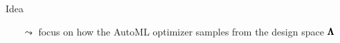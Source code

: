\begin{frame}[c,fragile]{Idea}

\begin{center}
\scalebox{0.9}{
	\let\oldpause=\pause \def\pause{} 
	
	\let\pause=\oldpause
}
\end{center}

\begin{itemize}
	\item[$\leadsto$] focus on how the AutoML optimizer samples from the design space $\pmb{\Lambda}$ 
\end{itemize}

\end{frame}
